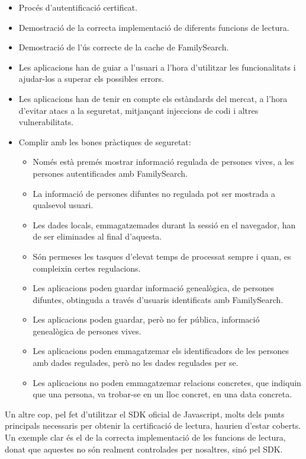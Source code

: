     \begin{itemize}
        \item Procés d'autentificació certificat.
        \item Demostració de la correcta implementació de diferents funcions de lectura.
        \item Demostració de l'ús correcte de la cache de FamilySearch.
        \item Les aplicacions han de guiar a l'usuari a l'hora d'utilitzar les funcionalitats i ajudar-los a superar els possibles errors.
        \item Les aplicacions han de tenir en compte els estàndards del mercat, a l'hora d'evitar atacs a la seguretat, mitjançant injeccions de codi i altres vulnerabilitats.
        \item Complir amb les bones pràctiques de seguretat:
        \begin{itemize}
            \item Només està premés mostrar informació regulada de persones vives, a les persones autentificades amb FamilySearch.
            \item La informació de persones difuntes no regulada pot ser mostrada a qualsevol usuari.
            \item Les dades locals, emmagatzemades durant la sessió en el navegador, han de ser eliminades al final d'aquesta.
            \item Són permeses les tasques d'elevat temps de processat sempre i quan, es compleixin certes regulacions.
            \item Les aplicacions poden guardar informació genealògica, de persones difuntes, obtinguda a través d'usuaris identificats amb FamilySearch.
            \item Les aplicacions poden guardar, però no fer pública, informació genealògica de persones vives.
            \item Les aplicacions poden emmagatzemar els identificadors de les persones amb dades regulades, però no les dades regulades per se.
            \item Les aplicacions no poden emmagatzemar relacions concretes, que indiquin que una persona, va trobar-se en un lloc concret, en una data concreta.
        \end{itemize}
    \end{itemize}

    Un altre cop, pel fet d'utilitzar el SDK oficial de Javascript, molts dels punts principals necessaris per obtenir la certificació de lectura, haurien d'estar coberts. Un exemple clar és el de la correcta implementació de les funcions de lectura, donat que aquestes no són realment controlades per nosaltres, sinó pel SDK.

